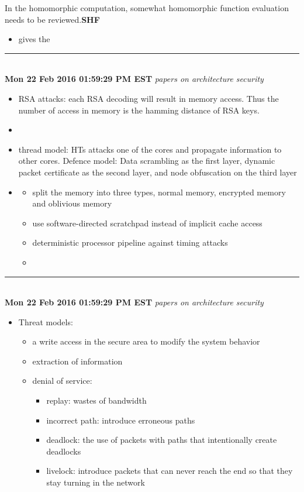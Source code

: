 \documentclass[]{article}
\begin{document}
In the homomorphic computation, somewhat homomorphic function evaluation needs to be reviewed.\textbf{SHF}
\begin{itemize}
	\item \cite{chen2015execution} gives the 
\end{itemize}

\rule[-0.1cm]{7.5in}{0.01cm}\\
\noindent \textbf{Mon 22 Feb 2016 01:59:29 PM EST}
\textit{papers on architecture security}
\begin{itemize}
	\item \cite{wang2014timing} RSA attacks: each RSA decoding will result in
memory access. Thus the number of access in memory is the hamming distance of
RSA keys.
	\item \cite{ismail2015improving} 
	\item \cite{ancajas2014fort} thread model: HTs attacks one of the cores and
propagate information to other cores.  Defence model: Data scrambling as the
first layer, dynamic packet certificate as the second layer, and node
obfuscation on the third layer
    \item \cite{liu2015ghostrider} 
        \begin{itemize}
            \item split the memory into three types, normal memory, encrypted memory and oblivious memory
            \item use software-directed scratchpad instead of implicit cache access
            \item deterministic processor pipeline against timing attacks
            \item

        \end{itemize}
\end{itemize}

\rule[-0.1cm]{7.5in}{0.01cm}\\
\noindent \textbf{Mon 22 Feb 2016 01:59:29 PM EST}
\textit{papers on architecture security}
\begin{itemize}
    \item \cite{diguet2007noc} Threat models:
        \begin{itemize}
            \item a write access in the secure area to modify the system behavior
            \item extraction of information
            \item denial of service:
                \begin{itemize}
                    \item replay: wastes of bandwidth
                    \item incorrect path: introduce erroneous paths
                    \item deadlock: the use of packets with paths that intentionally create deadlocks
                    \item livelock: introduce packets that can never reach the end so that they stay turning in the network
                \end{itemize}
        \end{itemize}
\end{itemize}
\end{document}
